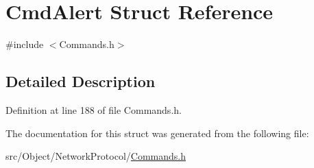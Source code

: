 \hypertarget{struct_cmd_alert}{
\section{CmdAlert Struct Reference}
\label{struct_cmd_alert}
}


{\ttfamily \#include $<$Commands.h$>$}



\subsection{Detailed Description}


Definition at line 188 of file Commands.h.



The documentation for this struct was generated from the following file:\begin{DoxyCompactItemize}
\item 
src/Object/NetworkProtocol/\hyperlink{_commands_8h}{Commands.h}\end{DoxyCompactItemize}
